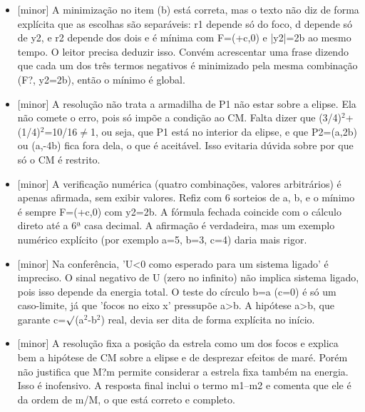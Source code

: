 \documentclass{article}%
\begin{document}
\begin{itemize}%
\item%
{[}minor{]} A minimização no item (b) está correta, mas o texto não diz de forma explícita que as escolhas são separáveis: r1 depende só do foco, d depende só de y2, e r2 depende dos dois e é mínima com F=(+c,0) e |y2|=2b ao mesmo tempo. O leitor precisa deduzir isso. Convém acrescentar uma frase dizendo que cada um dos três termos negativos é minimizado pela mesma combinação (F?, y2=2b), então o mínimo é global.%
\item%
{[}minor{]} A resolução não trata a armadilha de P1 não estar sobre a elipse. Ela não comete o erro, pois só impõe a condição ao CM. Falta dizer que (3/4)$^2$+(1/4)$^2$=10/16$\neq$1, ou seja, que P1 está no interior da elipse, e que P2=(a,2b) ou (a,-4b) fica fora dela, o que é aceitável. Isso evitaria dúvida sobre por que só o CM é restrito.%
\item%
{[}minor{]} A verificação numérica (quatro combinações, valores arbitrários) é apenas afirmada, sem exibir valores. Refiz com 6 sorteios de a, b, e o mínimo é sempre F=(+c,0) com y2=2b. A fórmula fechada coincide com o cálculo direto até a 6ª casa decimal. A afirmação é verdadeira, mas um exemplo numérico explícito (por exemplo a=5, b=3, c=4) daria mais rigor.%
\item%
{[}minor{]} Na conferência, 'U<0 como esperado para um sistema ligado' é impreciso. O sinal negativo de U (zero no infinito) não implica sistema ligado, pois isso depende da energia total. O teste do círculo b=a (c=0) é só um caso{-}limite, já que 'focos no eixo x' pressupõe a>b. A hipótese a>b, que garante c=$\surd$(a$^2$-b$^2$) real, devia ser dita de forma explícita no início.%
\item%
{[}minor{]} A resolução fixa a posição da estrela como um dos focos e explica bem a hipótese de CM sobre a elipse e de desprezar efeitos de maré. Porém não justifica que M?m permite considerar a estrela fixa também na energia. Isso é inofensivo. A resposta final inclui o termo m1--m2 e comenta que ele é da ordem de m/M, o que está correto e completo.%
\end{itemize}%
\end{document}
